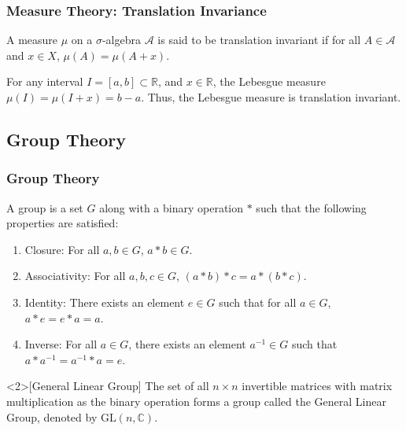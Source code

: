 \documentclass[11pt, xcolor={dvipsnames, svgnames, table, x11names}, color]{beamer}
\newcommand{\R}{\mathbb{R}}
\begin{document}
\begin{frame}
    \frametitle{Measure Theory: Translation Invariance}
    \begin{definition}
        A measure $\mu$ on a $\sigma$-algebra $\mathcal{A}$ is said to be translation invariant if for all $A \in \mathcal{A}$ and $x \in X$, $\mu(A) = \mu(A + x)$.
    \end{definition}

    \begin{example}
        For any interval $I = [a, b] \subset \R$, and $x \in \R$, the Lebesgue measure $\mu(I) = \mu(I + x) = b - a$. Thus, the Lebesgue measure is translation invariant.
    \end{example}

\end{frame}

\subsection{Group Theory}
\begin{frame}
    \frametitle{Group Theory}
    \begin{definition}[Group]
        A group is a set $G$ along with a binary operation $*$ such that the following properties are satisfied:
        \begin{enumerate}
            \item Closure: For all $a, b \in G$, $a * b \in G$.
            \item Associativity: For all $a, b, c \in G$, $(a * b) * c = a * (b * c)$.
            \item Identity: There exists an element $e \in G$ such that for all $a \in G$, $a * e = e * a = a$.
            \item Inverse: For all $a \in G$, there exists an element $a^{-1} \in G$ such that $a * a^{-1} = a^{-1} * a = e$.
        \end{enumerate}
    \end{definition}
    \begin{example}<2>[General Linear Group]
        The set of all $n \times n$ invertible matrices with matrix multiplication as the binary operation forms a group called the General Linear Group, denoted by $\text{GL}(n, \mathbb{C})$.
    \end{example}
\end{frame}
\end{document}
